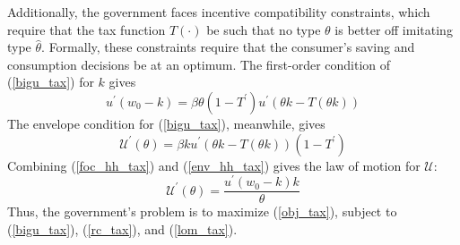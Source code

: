 \documentclass[11pt]{article}
\newcommand{\p}{\prime}
\newcommand{\U}{\mathcal{U}}
\begin{document}
Additionally, the government faces incentive compatibility constraints, which require that the tax function \( T(\cdot) \) be such that no type \( \theta \) is better off imitating type \( \hat{\theta} \). Formally, these constraints require that the consumer's saving and consumption decisions be at an optimum. The first-order condition of (\ref{bigu_tax}) for \( k \) gives
\begin{equation}
    u^\p(w_0 - k) = \beta \theta (1 - T^\p)u^\p (\theta k - T(\theta k)) \label{foc_hh_tax}
\end{equation}
The envelope condition for (\ref{bigu_tax}), meanwhile, gives 
\begin{equation}
    \U^\p(\theta) = \beta k u^\p (\theta k - T(\theta k)) (1 - T^\p) \label{env_hh_tax}
\end{equation}
Combining (\ref{foc_hh_tax}) and (\ref{env_hh_tax}) gives the law of motion for \( \U \):
\begin{equation}
    \U^\p(\theta) = \frac{u^\p(w_0 - k)k}{\theta} \label{lom_tax}
\end{equation}
Thus, the government's problem is to maximize (\ref{obj_tax}), subject to (\ref{bigu_tax}), (\ref{rc_tax}), and (\ref{lom_tax}). 
\end{document}
